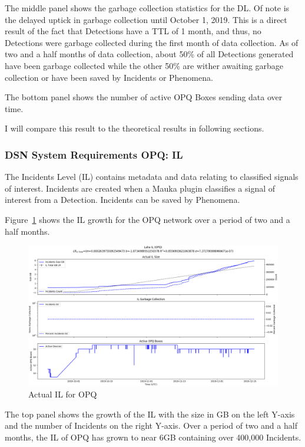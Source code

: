 The middle panel shows the garbage collection statistics for the DL. Of note is the delayed uptick in garbage collection until October 1, 2019. This is a direct result of the fact that Detections have a TTL of 1 month, and thus, no Detections were garbage collected during the first month of data collection. As of two and a half months of data collection, about 50\% of all Detections generated have been garbage collected while the other 50\% are wither awaiting garbage collection or have been saved by Incidents or Phenomena.

The bottom panel shows the number of active OPQ Boxes sending data over time.

I will compare this result to the theoretical results in following sections.

\subsubsection{DSN System Requirements OPQ: IL}

The Incidents Level (IL) contains metadata and data relating to classified signals of interest. Incidents are created when a Mauka plugin classifies a signal of interest from a Detection. Incidents can be saved by Phenomena.

Figure~\ref{fig:actual_il_opq} shows the IL growth for the OPQ network over a period of two and a half months.

\begin{figure}[H]
    \centering
    \includegraphics[width=\linewidth]{figures/actual_il_opq.png}
    \caption{Actual IL for OPQ}
    \label{fig:actual_il_opq}
\end{figure}

The top panel shows the growth of the IL with the size in GB on the left Y-axis and the number of Incidents on the right Y-axis. Over a period of two and a half months, the IL of OPQ has grown to near 6GB containing over 400,000 Incidents.

